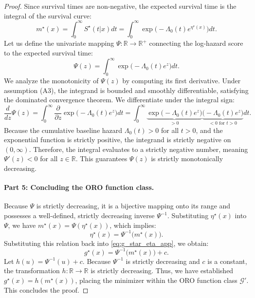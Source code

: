 \documentclass[11pt]{article}
\theoremstyle{plain}
\theoremstyle{plain}
\theoremstyle{plain}
\theoremstyle{plain}
\theoremstyle{plain}
\theoremstyle{plain}
\theoremstyle{plain}
\begin{document}
\begin{proof}
Since survival times are non-negative, the expected survival time is the integral of the survival curve:
\begin{equation}
    m^\star(x) = \int_0^\infty S^\star(t|x) dt = \int_0^\infty \exp\Big(-\Lambda_0(t) e^{\eta^\star(x)}\Big) dt.
\end{equation}
Let us define the univariate mapping $\Psi: \mathbb{R} \to \mathbb{R}^+$ connecting the log-hazard score to the expected survival time:
\begin{equation}
    \Psi(z) = \int_0^\infty \exp\Big(-\Lambda_0(t) e^{z}\Big) dt.
\end{equation}
We analyze the monotonicity of $\Psi(z)$ by computing its first derivative. Under assumption (A3), the integrand is bounded and smoothly differentiable, satisfying the dominated convergence theorem. We differentiate under the integral sign:
\begin{equation}
    \frac{d}{dz} \Psi(z) = \int_0^\infty \frac{\partial}{\partial z} \exp\Big(-\Lambda_0(t) e^{z}\Big) dt = \int_0^\infty \underbrace{\exp\Big(-\Lambda_0(t) e^{z}\Big)}_{> 0} \underbrace{\Big( -\Lambda_0(t) e^{z} \Big)}_{< 0 \text{ for } t>0} dt.
\end{equation}
Because the cumulative baseline hazard $\Lambda_0(t) > 0$ for all $t > 0$, and the exponential function is strictly positive, the integrand is strictly negative on $(0, \infty)$. Therefore, the integral evaluates to a strictly negative number, meaning $\Psi'(z) < 0$ for all $z \in \mathbb{R}$. This guarantees $\Psi(z)$ is strictly monotonically decreasing.

\paragraph{Part 5: Concluding the ORO function class.} 
Because $\Psi$ is strictly decreasing, it is a bijective mapping onto its range and possesses a well-defined, strictly decreasing inverse $\Psi^{-1}$. Substituting $\eta^\star(x)$ into $\Psi$, we have $m^\star(x) = \Psi(\eta^\star(x))$, which implies:
\begin{equation}
    \eta^\star(x) = \Psi^{-1}\big(m^\star(x)\big).
\end{equation}
Substituting this relation back into \eqref{eq:g_star_eta_app}, we obtain:
\begin{equation}
    g^\star(x) = \Psi^{-1}\big(m^\star(x)\big) + c.
\end{equation}
Let $h(u) = \Psi^{-1}(u) + c$. Because $\Psi^{-1}$ is strictly decreasing and $c$ is a constant, the transformation $h:\mathbb{R} \to \mathbb{R}$ is strictly decreasing. Thus, we have established $g^\star(x) = h(m^\star(x))$, placing the minimizer within the ORO function class $\mathcal{G}'$. This concludes the proof.
\end{proof}
\end{document}
